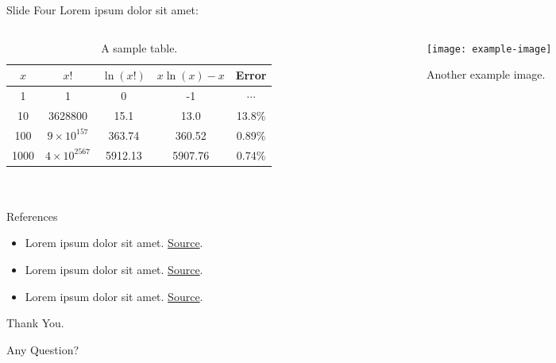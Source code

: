 \documentclass[aspectratio=169]{beamer}  %
\begin{document}

\begin{frame}{Slide Four}
 Lorem ipsum dolor sit amet:
    \begin{columns}
        \begin{column}{0.5\textwidth}
           \begin{framefont}{\footnotesize}
               \begin{table}
                   \centering
                   \begin{tabular}{|c|c|c|c|c|} 
                       \hline
                       $x$ & $x!$ & $\ln(x!)$ & $x\ln(x) - x$ & Error \\ \hline
                       1 & 1 & 0 & -1 & $\cdots$ \\ \hline
                       10 & 3628800 & 15.1 & 13.0 & 13.8\% \\ \hline
                       100 & $9\times 10^{157}$ & 363.74 & 360.52 & 0.89\% \\ \hline
                       1000 & $4\times 10^{2567}$ & 5912.13 & 5907.76 & 0.74\% \\ \hline 
                   \end{tabular} 
                   \caption{A sample table.}
                   \label{tab:table}
               \end{table}
            \end{framefont}
        \end{column}
        \begin{column}{0.4\textwidth}  
            \begin{figure}
                \centering
                \texttt{[image: example-image]}
                \caption{Another example image.}
            \end{figure}
        \end{column}
    \end{columns}
\end{frame}


\bulletoff\section*{}
\begin{frame}{References}
\begin{itemize}
    \item Lorem ipsum dolor sit amet. \href{<>}{Source}. 
    \item Lorem ipsum dolor sit amet. \href{<>}{Source}. 
    \item Lorem ipsum dolor sit amet. \href{<>}{Source}. 
\end{itemize}
\end{frame}


\begin{frame}[noframenumbering]
\Huge\centerline{Thank You.}
\huge\centerline{Any Question?}
\end{frame}

\end{document}
